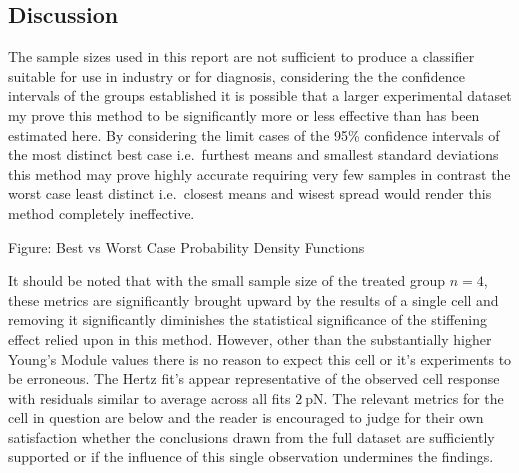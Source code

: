 \documentclass[
  paper=a4,
  ,captions=tableheading
]{scrartcl}
\makeatletter
\newcommand*\pandocbounded[1]{%
  \sbox\pandoc@box{#1}%
  \Gscale@div\@tempa{\textheight}{\dimexpr\ht\pandoc@box+\dp\pandoc@box\relax}%
  \Gscale@div\@tempb{\linewidth}{\wd\pandoc@box}%
  \ifdim\@tempb\p@<\@tempa\p@\let\@tempa\@tempb\fi%
  \ifdim\@tempa\p@<\p@\scalebox{\@tempa}{\usebox\pandoc@box}%
  \else\usebox{\pandoc@box}%
  \fi%
}
\makeatother
\begin{document}
\subsection{Discussion}\label{discussion}

The sample sizes used in this report are not sufficient to produce a
classifier suitable for use in industry or for diagnosis, considering
the the confidence intervals of the groups established it is possible
that a larger experimental dataset my prove this method to be
significantly more or less effective than has been estimated here. By
considering the limit cases of the 95\% confidence intervals of the most
distinct best case i.e.~furthest means and smallest standard deviations
this method may prove highly accurate requiring very few samples in
contrast the worst case least distinct i.e.~closest means and wisest
spread would render this method completely ineffective.

Figure: Best vs Worst Case Probability Density Functions

\pandocbounded{}

It should be noted that with the small sample size of the treated group
\(n=4\), these metrics are significantly brought upward by the results
of a single cell and removing it significantly diminishes the
statistical significance of the stiffening effect relied upon in this
method. However, other than the substantially higher Young's Module
values there is no reason to expect this cell or it's experiments to be
erroneous. The Hertz fit's appear representative of the observed cell
response with residuals similar to average across all fits
\(2 \ \text{pN}\). The relevant metrics for the cell in question are
below and the reader is encouraged to judge for their own satisfaction
whether the conclusions drawn from the full dataset are sufficiently
supported or if the influence of this single observation undermines the
findings.

\begin{figure}
\centering
\pandocbounded{}
\caption{}
\end{figure}
\end{document}

